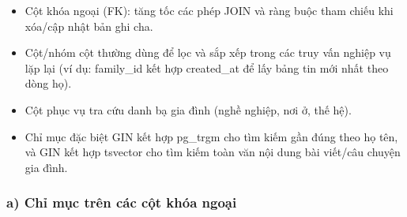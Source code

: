 \begin{itemize}
	\item Cột khóa ngoại (FK):
	tăng tốc các phép JOIN
	và ràng buộc tham chiếu
	khi xóa/cập nhật bản ghi cha.

	\item Cột/nhóm cột thường dùng
	để lọc và sắp xếp
	trong các truy vấn nghiệp vụ lặp lại
	(ví dụ: family\_id kết hợp created\_at
	để lấy bảng tin mới nhất
	theo dòng họ).

	\item Cột phục vụ tra cứu
	danh bạ gia đình
	(nghề nghiệp, nơi ở, thế hệ).

	\item Chỉ mục đặc biệt GIN
	kết hợp pg\_trgm
	cho tìm kiếm gần đúng theo họ tên,
	và GIN kết hợp tsvector
	cho tìm kiếm toàn văn
	nội dung bài viết/câu chuyện gia đình.
\end{itemize}

\subsubsection{a) Chỉ mục trên các cột khóa ngoại}

\renewcommand{\arraystretch}{1.3}
\setlength{\tabcolsep}{3pt}

